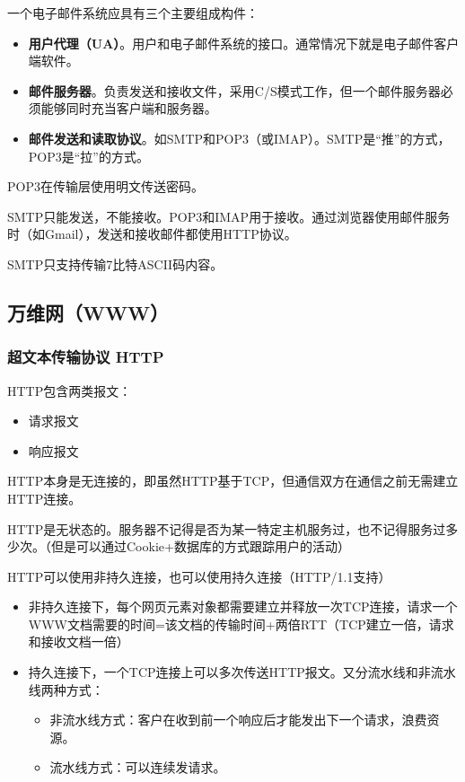 \documentclass[12pt, a4paper, oneside]{ctexart}
\begin{document}
一个电子邮件系统应具有三个主要组成构件：
\begin{itemize}
    \item {\bf 用户代理（UA）}。用户和电子邮件系统的接口。通常情况下就是电子邮件客户端软件。
    \item {\bf 邮件服务器}。负责发送和接收文件，采用C/S模式工作，但一个邮件服务器必须能够同时充当客户端和服务器。
    \item {\bf 邮件发送和读取协议}。如SMTP和POP3（或IMAP）。SMTP是“推”的方式，POP3是“拉”的方式。
\end{itemize}

POP3在传输层使用明文传送密码。

SMTP只能发送，不能接收。POP3和IMAP用于接收。通过浏览器使用邮件服务时（如Gmail），发送和接收邮件都使用HTTP协议。

SMTP只支持传输7比特ASCII码内容。

\subsection{万维网（WWW）}

\subsubsection{超文本传输协议 HTTP}

HTTP包含两类报文：
\begin{itemize}
    \item 请求报文
    \item 响应报文
\end{itemize}

HTTP本身是无连接的，即虽然HTTP基于TCP，但通信双方在通信之前无需建立HTTP连接。

HTTP是无状态的。服务器不记得是否为某一特定主机服务过，也不记得服务过多少次。（但是可以通过Cookie+数据库的方式跟踪用户的活动）

HTTP可以使用非持久连接，也可以使用持久连接（HTTP/1.1支持）
\begin{itemize}
    \item 非持久连接下，每个网页元素对象都需要建立并释放一次TCP连接，请求一个WWW文档需要的时间=该文档的传输时间+两倍RTT（TCP建立一倍，请求和接收文档一倍）
    \item 持久连接下，一个TCP连接上可以多次传送HTTP报文。又分流水线和非流水线两种方式：
    \begin{itemize}
        \item 非流水线方式：客户在收到前一个响应后才能发出下一个请求，浪费资源。
        \item 流水线方式：可以连续发请求。
    \end{itemize}
\end{itemize}
\end{document}
